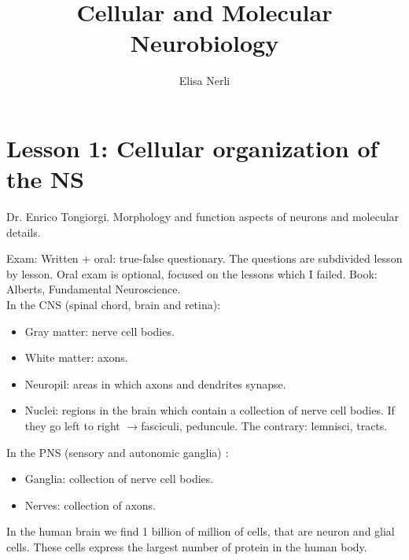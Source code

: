 \documentclass[a4paper, 12pt]{book}
\newcommand{\freccia}{\ensuremath{\rightarrow}}
\begin{document}
\author{Elisa Nerli}
\title{Cellular and Molecular Neurobiology}
\maketitle
\newpage
\tableofcontents
\newpage

\chapter{Lesson 1: Cellular organization of the NS}
Dr. Enrico Tongiorgi.
Morphology and function aspects of neurons and molecular details. 

Exam:  Written + oral: true-false questionary. The questions are subdivided lesson by lesson. Oral exam is optional, focused on the lessons which I failed. 
 Book: Alberts, Fundamental Neuroscience.
\\

In the CNS (spinal chord, brain and retina):
\begin{itemize}
\item{Gray matter: nerve cell bodies.}

\item{White matter: axons.}

\item{Neuropil: areas in which axons and dendrites synapse.}

\item{Nuclei: regions in the brain which contain a collection of nerve cell bodies. If they go left to right \freccia fasciculi, peduncule. The contrary: lemnisci, tracts.}
\end{itemize}
In the PNS (sensory and autonomic ganglia) :
\begin{itemize}
\item{Ganglia: collection of nerve cell bodies.}
\item{Nerves: collection of axons.} 
\end{itemize}

In the human brain we find 1 billion of million of cells, that are neuron and glial cells.
 These cells express the largest number of protein in the human body.
\end{document}
